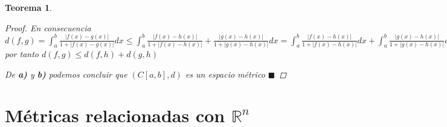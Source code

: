 \documentclass[oneside]{book} %
\theoremstyle{Teorema}
\newtheorem{Teorema}[Definicion]{Teorema}
\theoremstyle{Ejemplos}
\theoremstyle{[Obs]}
\newcommand{\abs}[1]{\left|#1\right|} %
\renewcommand{\{}{\left\lbrace} %
\renewcommand{\}}{\right\rbrace} %
\newcommand{\Rn}{\mathbb{R}^n} %
\renewcommand{\qed}{$\blacksquare$} %
\begin{document}
\begin{Teorema}
\begin{proof}
					En consecuencia $d(f, g) = \int_{a}^{b} \frac{\abs{f(x) - g(x)}}{1 + \abs{f(x) - g(x)}} dx \leq \int_{a}^{b} \frac{\abs{f(x) - h(x)}}{1 + \abs{f(x) - h(x)}} + \frac{\abs{g(x) - h(x)}}{1 + \abs{g(x) - h(x)}} dx = \int_{a}^{b} \frac{\abs{f(x) - h(x)}}{1 + \abs{f(x) - h(x)}} dx + \int_{a}^{b} \frac{\abs{g(x) - h(x)}}{1 + \abs{g(x) - h(x)}} dx = d(f, h) + f(g, h)$ por tanto $d(f, g) \leq d(f, h) + d(g, h)$

					De \textbf{a)} y \textbf{b)} podemos concluir que $(C[a, b], d)$ es un espacio métrico \qed

				\end{proof}

			\end{Teorema}

		\section{Métricas relacionadas con $\Rn$}
\end{document}
